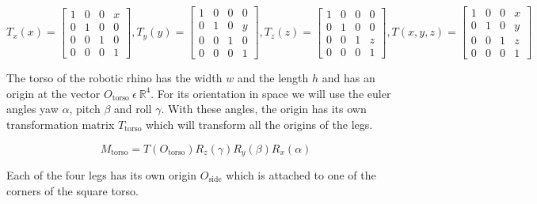 \documentclass{article}
\begin{document}
    \begin{equation}
        T_x(x) =
        \begin{bmatrix}
            1 & 0 & 0 & x \\
            0 & 1 & 0 & 0 \\
            0 & 0 & 1 & 0 \\
            0 & 0 & 0 & 1
        \end{bmatrix},
        T_y(y) =
        \begin{bmatrix}
            1 & 0 & 0 & 0 \\
            0 & 1 & 0 & y \\
            0 & 0 & 1 & 0 \\
            0 & 0 & 0 & 1
        \end{bmatrix},
        T_z(z) =
        \begin{bmatrix}
            1 & 0 & 0 & 0 \\
            0 & 1 & 0 & 0 \\
            0 & 0 & 1 & z \\
            0 & 0 & 0 & 1
        \end{bmatrix},
        T(x, y, z) = \begin{bmatrix}
            1 & 0 & 0 & x \\
            0 & 1 & 0 & y \\
            0 & 0 & 1 & z \\
            0 & 0 & 0 & 1
        \end{bmatrix}
    \end{equation}

    The torso of the robotic rhino has the width $w$ and the length $h$ and has
    an origin at the vector $O_{\mathrm{torso}}\ \epsilon \ \mathbb{R}^4$.
    For its orientation in space we will use the euler angles yaw $\alpha$,
    pitch $\beta$ and roll $\gamma$.
    With these angles, the origin has its own
    transformation matrix $T_{\mathrm{torso}}$ which will transform all the origins of the legs.

    \begin{equation}
        M_{\mathrm{torso}} = T(O_{\mathrm{torso}}) R_z(\gamma) R_y(\beta) R_x(\alpha)
    \end{equation}

    Each of the four legs has its own origin $O_{\mathrm{side}}$ which is attached to one of the
    corners of the square torso.
\end{document}
